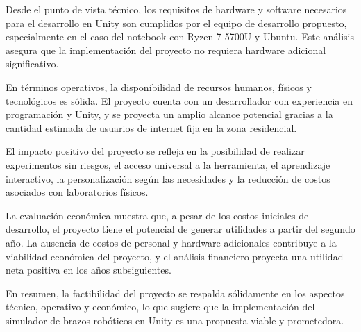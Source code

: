 Desde el punto de vista técnico, los requisitos de hardware y software necesarios para el desarrollo en Unity son cumplidos por el equipo de desarrollo propuesto, especialmente en el caso del notebook con Ryzen 7 5700U y Ubuntu. Este análisis asegura que la implementación del proyecto no requiera hardware adicional significativo.

En términos operativos, la disponibilidad de recursos humanos, físicos y tecnológicos es sólida. El proyecto cuenta con un desarrollador con experiencia en programación y Unity, y se proyecta un amplio alcance potencial gracias a la cantidad estimada de usuarios de internet fija en la zona residencial.

El impacto positivo del proyecto se refleja en la posibilidad de realizar experimentos sin riesgos, el acceso universal a la herramienta, el aprendizaje interactivo, la personalización según las necesidades y la reducción de costos asociados con laboratorios físicos.

La evaluación económica muestra que, a pesar de los costos iniciales de desarrollo, el proyecto tiene el potencial de generar utilidades a partir del segundo año. La ausencia de costos de personal y hardware adicionales contribuye a la viabilidad económica del proyecto, y el análisis financiero proyecta una utilidad neta positiva en los años subsiguientes.

En resumen, la factibilidad del proyecto se respalda sólidamente en los aspectos técnico, operativo y económico, lo que sugiere que la implementación del simulador de brazos robóticos en Unity es una propuesta viable y prometedora.